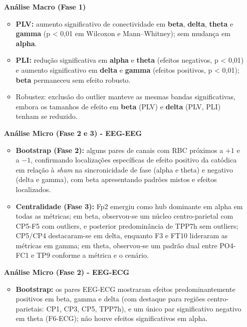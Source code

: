 \begin{itemize}
  \item[\textbf{Análise Macro (Fase 1)}]  
    \begin{itemize}
      \item \textbf{PLV:} aumento significativo de conectividade em \textbf{beta}, \textbf{delta}, \textbf{theta} e \textbf{gamma} (p < 0,01 em Wilcoxon e Mann–Whitney); sem mudança em \textbf{alpha}.
      \item \textbf{PLI:} redução significativa em \textbf{alpha} e \textbf{theta} (efeitos negativos, p < 0,01) e aumento significativo em \textbf{delta} e \textbf{gamma} (efeitos positivos, p < 0,01); \textbf{beta} permaneceu sem efeito robusto.
      \item Robustez: exclusão do outlier manteve as mesmas bandas significativas, embora os tamanhos de efeito em \textbf{beta} (PLV) e \textbf{delta} (PLV, PLI) tenham se reduzido.
    \end{itemize}

  \item[\textbf{Análise Micro (Fase 2 e 3) - EEG-EEG}]  
    \begin{itemize}
      \item \textbf{Bootstrap (Fase 2):} alguns pares de canais com RBC próximos a $+1$ e a $-1$, confirmando localizações específicas de efeito positivo da catódica em relação à \textit{sham} na sincronicidade de fase (alpha e theta) e negativo (delta e gamma), com beta apresentando padrões mistos e efeitos localizados.
      \item \textbf{Centralidade (Fase 3):} Fp2 emergiu como hub dominante em alpha em todas as métricas; em beta, observou-se um núcleo centro-parietal com CP5-F5 com outliers, e posterior predominância de TPP7h sem outliers; CP5/CP4 destacaram-se em delta, enquanto F3 e FT10 lideraram as métricas em gamma; em theta, observou-se um padrão dual entre PO4-FC1 e TP9 conforme a métrica e o cenário.
    \end{itemize}

  \item[\textbf{Análise Micro (Fase 2) - EEG-ECG}]  
    \begin{itemize}
      \item \textbf{Bootstrap:} os pares EEG-ECG mostraram efeitos predominantemente positivos em beta, gamma e delta (com destaque para regiões centro-parietais: CP1, CP3, CP5, TPP7h), e um único par significativo negativo em theta (F6-ECG); não houve efeitos significativos em alpha.
    \end{itemize}

\end{itemize}

